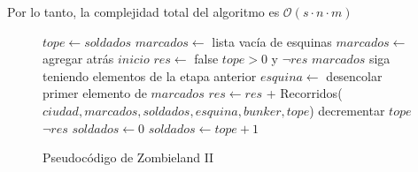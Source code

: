 Por lo tanto, la complejidad total del algoritmo es $\mathcal{O}(s \cdot n \cdot m)$

\begin{figure}[!ht]
\begin{codebox}
\li $tope \leftarrow soldados$
\li $marcados \leftarrow$ lista vacía de esquinas
\li $marcados \leftarrow$ agregar atrás $inicio$
\li $res \leftarrow$ false
\li \While $tope > 0$ y $\neg res$
\li		\Do \While $marcados$ siga teniendo elementos de la etapa anterior
\li				\Do
					$esquina \leftarrow$ desencolar primer elemento de $marcados$
\li					$res \leftarrow res$ + {\sc Recorridos}($ciudad,marcados,soldados,esquina,bunker,tope$)
				\End
\li			decrementar $tope$
		\End
\li	\If $\neg res$
\li		\Do $soldados \leftarrow 0$ \End
\li		\Else 
\li			\Do $soldados \leftarrow tope + 1$
			\End
		\End
\end{codebox} 
\caption{Pseudocódigo de Zombieland II}\label{code:zombieland}
\end{figure}


